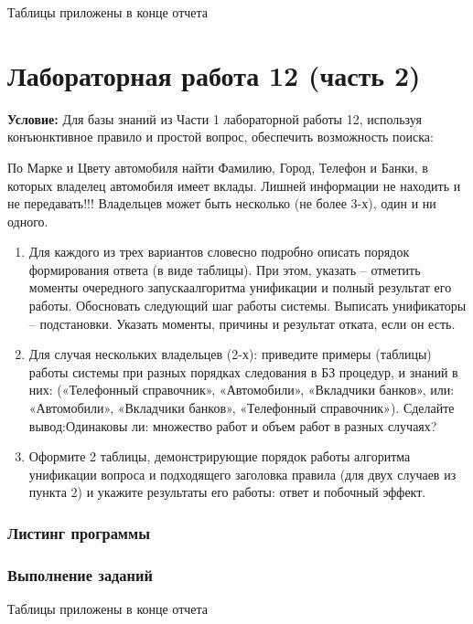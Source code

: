 Таблицы приложены в конце отчета

\section{Лабораторная работа 12 (часть 2)}

\textbf{Условие:} Для базы знаний из Части 1 лабораторной работы 12, используя конъюнктивное правило и простой вопрос, обеспечить возможность поиска: 

По Марке и Цвету автомобиля найти Фамилию, Город, Телефон и Банки, в которых владелец автомобиля имеет вклады. Лишней информации не находить и не передавать!!! Владельцев может быть несколько (не более 3-х), один и ни одного. 


\begin{enumerate}
	\item Для каждого из трех вариантов словесно подробно описать порядок формирования ответа (в виде таблицы). При этом, указать – отметить моменты очередного запускаалгоритма унификации и полный результат его работы. Обосновать следующий шаг работы системы. Выписать унификаторы – подстановки. Указать моменты, причины и результат отката, если он есть.
	\item Для случая нескольких владельцев (2-х): приведите примеры (таблицы) работы системы при разных порядках следования в БЗ процедур, и знаний в них: («Телефонный справочник», «Автомобили», «Вкладчики банков», или: «Автомобили», «Вкладчики банков», «Телефонный справочник»). Сделайте вывод:Одинаковы ли: множество работ и объем работ в разных случаях? 
	\item Оформите 2 таблицы, демонстрирующие порядок работы алгоритма унификации вопроса и подходящего заголовка правила (для двух случаев из пункта 2) и укажите результаты его работы: ответ и побочный эффект.
\end{enumerate}


\subsubsection{Листинг программы}




\subsubsection{Выполнение заданий}

Таблицы приложены в конце отчета
